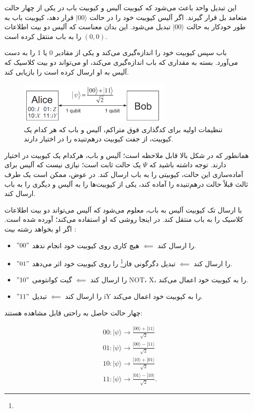 \documentclass{book}
\begin{document}
این تبدیل واحد باعث می‌شود که کیوبیت آلیس و کیوبیت باب در یکی از چهار حالت متعامد بل قرار گیرند. اگر آلیس کیوبیت خود را در حالت $\vert 00 \rangle$ قرار دهد، کیوبیت باب به طور خودکار به حالت $\vert 00 \rangle$ تبدیل می‌شود. این بدان معناست که آلیس دو بیت اطلاعات $(0, 0)$ را به باب منتقل کرده است.

باب سپس کیوبیت خود را اندازه‌گیری می‌کند و یکی از مقادیر 0 یا 1 را به دست می‌آورد. بسته به مقداری که باب اندازه‌گیری می‌کند، او می‌تواند دو بیت کلاسیک که آلیس به او ارسال کرده است را بازیابی کند.
\pagebreak

\begin{center}
\begin{figure}[h]
\centering
\includegraphics[width=3in]{super dence.png}
\caption{تنظیمات اولیه برای کدگذاری فوق متراکم، آلیس و باب که هر کدام یک کیوبیت، از جفت کیوبیت درهم‌تنیده را در اختیار دارند.}
\label{fig:myimage}
\end{figure}
\end{center}

همانطور که در شکل بالا قابل ملاحظه است؛ آلیس و باب، هرکدام یک کیوبیت در اختیار دارند. توجه داشته باشید که $\Psi$ یک حالت ثابت است؛ نیازی نیست که آلیس برای آماده‌سازی این حالت، کیوبیتی را به باب ارسال کند. در عوض، ممکن است یک طرف ثالث قبلاً حالت درهم‌تنیده را آماده کند، یکی از کیوبیت‌ها را به آلیس و دیگری را به باب ارسال کند.

با ارسال تک کیوبیت آلیس  به باب، معلوم می‌شود که آلیس می‌تواند دو بیت اطلاعات کلاسیک را به باب منتقل کند. در اینجا روشی که او استفاده می‌کند؛ آورده شده است. اگر او بخواهد رشته بیت :

\begin{itemize}
	\item  $"00"$ را ارسال کند $\impliedby$ هیچ کاری روی کیوبیت خود انجام ندهد.
	\item $"01"$ را ارسال کند $\impliedby$ تبدیل دگرگونی فاز\footnote{} را روی کیوبیت خود اثر می‌دهد.
	\item  $"10"$ را ارسال کند $\impliedby$ گیت کوانتومی NOT، X، را به کیوبیت خود اعمال می‌کند.
	\item  $"11"$ را ارسال کند $\impliedby$ تبدیل iY را به کیوبیت خود اعمال می‌کند.
\end{itemize}
چهار حالت حاصل به راحتی قابل مشاهده هستند:
\begin{center}
\begin{equation}\label{Alice action superdense}
	\begin{aligned}
		& 00:|\psi\rangle \rightarrow \frac{|00\rangle+|11\rangle}{\sqrt{2}} \\
		& 01:|\psi\rangle \rightarrow \frac{|00\rangle-|11\rangle}{\sqrt{2}} \\
		& 10:|\psi\rangle \rightarrow \frac{|10\rangle+|01\rangle}{\sqrt{2}} \\
		& 11:|\psi\rangle \rightarrow \frac{|01\rangle-|10\rangle}{\sqrt{2}} .
	\end{aligned}
\end{equation}
\end{center}
\end{document}
